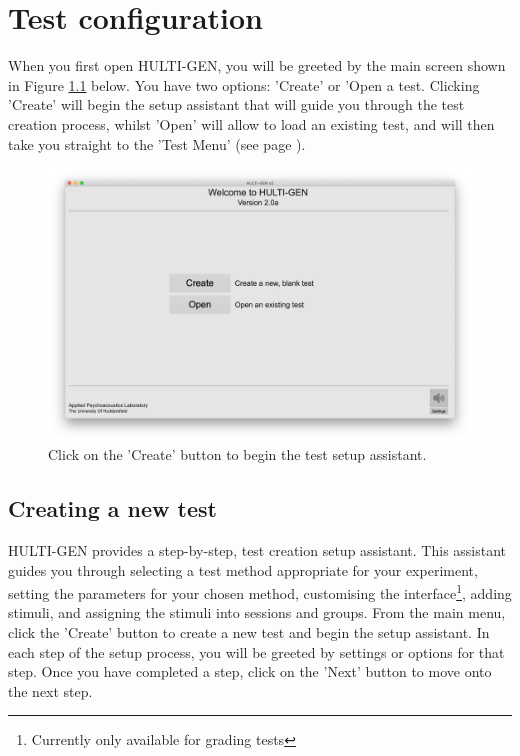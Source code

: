 \chapter{Test configuration}
When you first open HULTI-GEN, you will be greeted by the main screen shown in Figure \ref{mainScreen} below. You have two options: 'Create' or 'Open a test. Clicking 'Create' will begin the setup assistant that will guide you through the test creation process, whilst 'Open' will allow to load an existing test, and will then take you straight to the 'Test Menu' (see page \pageref{chap::run}).
\begin{figure}[ht]
	\centering
	\includegraphics[width=1.0\textwidth]{./images/createTest_step01_mainScreen.png}
	\caption{Click on the 'Create' button to begin the test setup assistant.}
	\label{mainScreen}
\end{figure}
\pagebreak

\section{Creating a new test}
HULTI-GEN provides a step-by-step, test creation setup assistant. This assistant guides you through selecting a test method appropriate for your experiment, setting the parameters for your chosen method, customising the interface\footnote{Currently only available for grading tests}, adding stimuli, and assigning the stimuli into sessions and groups.
\newline\newline
From the main menu, click the 'Create' button to create a new test and begin the setup assistant. In each step of the setup process, you will be greeted by settings or options for that step. Once you have completed a step, click on the 'Next' button to move onto the next step.

